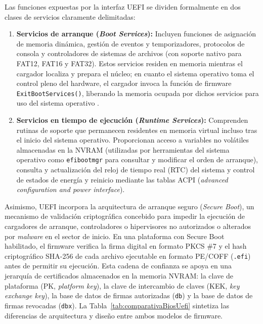 \documentclass[12pt]{article}
\begin{document}
Las funciones expuestas por la interfaz UEFI se dividen formalmente en dos clases de servicios claramente delimitadas:
\begin{enumerate}[noitemsep, topsep=2pt]
    \item \textbf{Servicios de arranque (\textit{Boot Services}):} Incluyen funciones de asignación de memoria dinámica, gestión de eventos y temporizadores, protocolos de consola y controladores de sistemas de archivos (con soporte nativo para FAT12, FAT16 y FAT32). Estos servicios residen en memoria mientras el cargador localiza y prepara el núcleo; en cuanto el sistema operativo toma el control pleno del hardware, el cargador invoca la función de firmware \texttt{ExitBootServices()}, liberando la memoria ocupada por dichos servicios para uso del sistema operativo \parencite[\S 13, p.\ 38]{uefi2024specification}.
    \item \textbf{Servicios en tiempo de ejecución (\textit{Runtime Services}):} Comprenden rutinas de soporte que permanecen residentes en memoria virtual incluso tras el inicio del sistema operativo. Proporcionan acceso a variables no volátiles almacenadas en la NVRAM (utilizadas por herramientas del sistema operativo como \texttt{efibootmgr} para consultar y modificar el orden de arranque), consulta y actualización del reloj de tiempo real (RTC) del sistema y control de estados de energía y reinicio mediante las tablas ACPI (\textit{advanced configuration and power interface}).
\end{enumerate}

Asimismo, UEFI incorpora la arquitectura de arranque seguro (\textit{Secure Boot}), un mecanismo de validación criptográfica concebido para impedir la ejecución de cargadores de arranque, controladores o hipervisores no autorizados o alterados por \textit{malware} en el sector de inicio. En una plataforma con Secure Boot habilitado, el firmware verifica la firma digital en formato PKCS \#7 y el hash criptográfico SHA-256 de cada archivo ejecutable en formato PE/COFF (\texttt{.efi}) antes de permitir su ejecución. Esta cadena de confianza se apoya en una jerarquía de certificados almacenados en la memoria NVRAM: la clave de plataforma (PK, \textit{platform key}), la clave de intercambio de claves (KEK, \textit{key exchange key}), la base de datos de firmas autorizadas (\texttt{db}) y la base de datos de firmas revocadas (\texttt{dbx}). La Tabla~\ref{tab:comparativaBiosUefi} sintetiza las diferencias de arquitectura y diseño entre ambos modelos de firmware.
\end{document}
